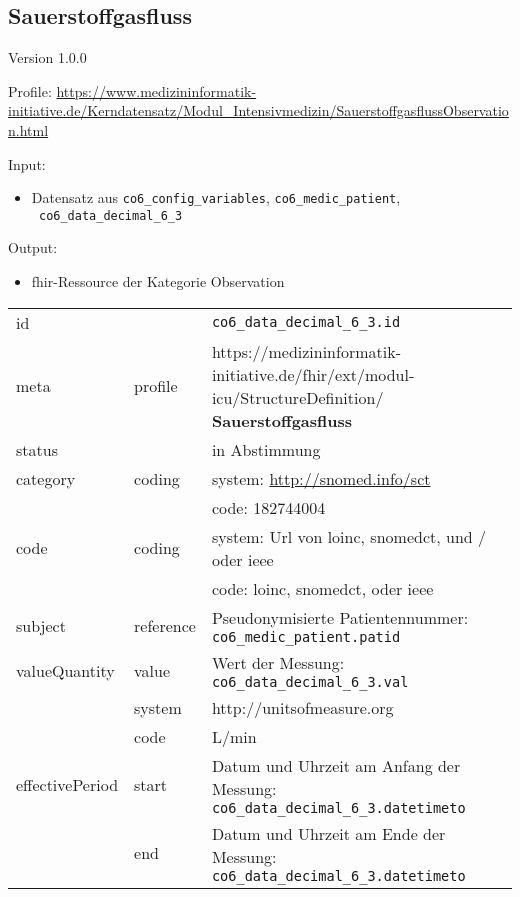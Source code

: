 \subsection{Sauerstoffgasfluss} 
\noindent Version 1.0.0

\noindent Profile: \url{https://www.medizininformatik-initiative.de/Kerndatensatz/Modul_Intensivmedizin/SauerstoffgasflussObservation.html}

\noindent Input:
\begin{itemize}
	\item Datensatz aus \texttt{co6\_config\_variables}, \texttt{co6\_medic\_patient}, \\ \texttt{
co6\_data\_decimal\_6\_3}
\end{itemize}
Output:
\begin{itemize}
        \item \ac{fhir}-Ressource der Kategorie \glqq Observation\grqq{}
\end{itemize}
\begin{longtable}{|l|l|p{7.5cm}|}
        \hline
        \rowcolor{lightgray} \multicolumn{3}{|l|}{Data Mapping (inhaltlich)} \\ \hline
        id &  & \texttt{co6\_data\_decimal\_6\_3.id} \\ \hline
	meta & profile & https://medizininformatik-initiative.de/fhir/ext/modul-icu/StructureDefinition/\textbf{
Sauerstoffgasfluss} \\ \hline 
	status &  & in Abstimmung  \\ \hline 
	category & coding & system: \url{http://snomed.info/sct} \\
\cline{3-3}
	& & code: 182744004 \\ \hline
	code & coding & system: Url von \ac{loinc}, \ac{snomedct}, und / oder \ac{ieee} \\ 
	\cline{3-3} 
	 &  & code: \ac{loinc}, \ac{snomedct}, oder \ac{ieee} \\ \hline
	subject & reference & Pseudonymisierte Patientennummer: \texttt{co6\_medic\_patient.patid} \\ \hline
	valueQuantity & value & Wert der Messung: \texttt{
co6\_data\_decimal\_6\_3.val} \\
        \cline{2-3}
         & system & http://unitsofmeasure.org \\
         \cline{2-3}
         & code & L/min \\ \hline
    effectivePeriod & start & Datum und Uhrzeit am Anfang der Messung: \texttt{
co6\_data\_decimal\_6\_3.datetimeto} \\
    \cline{2-3}
     & end & Datum und Uhrzeit am Ende der Messung: \texttt{
co6\_data\_decimal\_6\_3.datetimeto} \\ \hline
\end{longtable}


